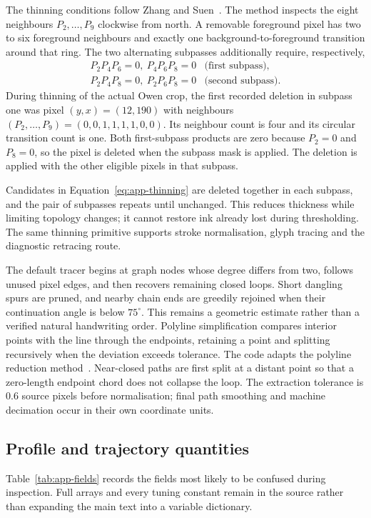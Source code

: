 The thinning conditions follow Zhang and Suen~\cite[p.~237]{zhang1984}. The method inspects the eight neighbours $P_2,\ldots,P_9$ clockwise from north. A removable foreground pixel has two to six foreground neighbours and exactly one background-to-foreground transition around that ring. The two alternating subpasses additionally require, respectively,
\begin{equation}
\begin{array}{ll}
P_2P_4P_6=0,\ P_4P_6P_8=0 &\text{(first subpass)},\\
P_2P_4P_8=0,\ P_2P_6P_8=0 &\text{(second subpass)}.
\end{array}
\label{eq:app-thinning}
\end{equation}
During thinning of the actual Owen crop, the first recorded deletion in subpass one was pixel $(y,x)=(12,190)$ with neighbours $(P_2,\ldots,P_9)=(0,0,1,1,1,1,0,0)$. Its neighbour count is four and its circular transition count is one. Both first-subpass products are zero because $P_2=0$ and $P_8=0$, so the pixel is deleted when the subpass mask is applied. The deletion is applied with the other eligible pixels in that subpass.

Candidates in Equation~\ref{eq:app-thinning} are deleted together in each subpass, and the pair of subpasses repeats until unchanged. This reduces thickness while limiting topology changes; it cannot restore ink already lost during thresholding. The same thinning primitive supports stroke normalisation, glyph tracing and the diagnostic retracing route.

The default tracer begins at graph nodes whose degree differs from two, follows unused pixel edges, and then recovers remaining closed loops. Short dangling spurs are pruned, and nearby chain ends are greedily rejoined when their continuation angle is below $75^\circ$. This remains a geometric estimate rather than a verified natural handwriting order. Polyline simplification compares interior points with the line through the endpoints, retaining a point and splitting recursively when the deviation exceeds tolerance. The code adapts the polyline reduction method~\cite[page to verify]{douglas1973}. Near-closed paths are first split at a distant point so that a zero-length endpoint chord does not collapse the loop. The extraction tolerance is 0.6 source pixels before normalisation; final path smoothing and machine decimation occur in their own coordinate units.

\subsection{Profile and trajectory quantities}
Table~\ref{tab:app-fields} records the fields most likely to be confused during inspection. Full arrays and every tuning constant remain in the source rather than expanding the main text into a variable dictionary.

